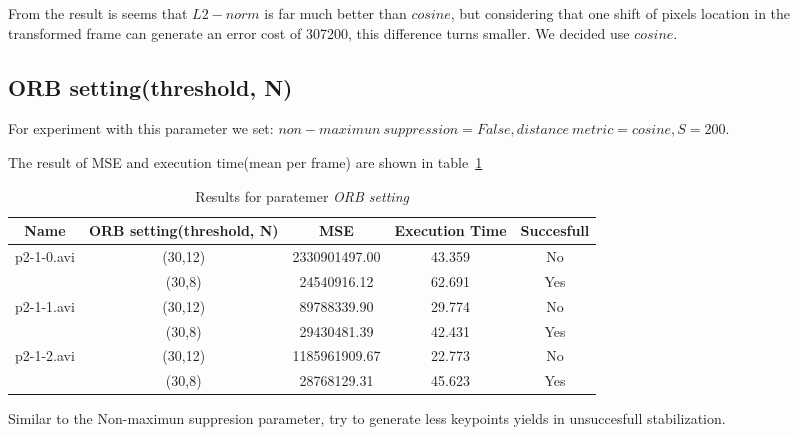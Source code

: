 From the result is seems that $L2-norm$ is far much better than $cosine$, but considering that one shift of pixels location in the transformed frame can generate an error cost of 307200, this difference turns smaller. We decided use $cosine$.

\subsection{ORB setting(threshold, N)}

For experiment with this parameter we set: $non-maximun~suppression=False, distance~metric=cosine, S = 200$.

The result of MSE and execution time(mean per frame) are shown in table~\ref{table:comparison-ORB}

\begin{table}[H]
\centering
\begin{tabular}{|c|c|c|c|c|}
\hline
\textbf{Name} & \textbf{ORB setting(threshold, N)} & \textbf{MSE} & \textbf{Execution Time} & \textbf{Succesfull} \\ \hline
\multirow{2}{*}{p2-1-0.avi} & (30,12) & 2330901497.00 & 43.359 & No \\ \cline{2-5} 
 & (30,8) & 24540916.12 & 62.691 & Yes \\ \hline
\multirow{2}{*}{p2-1-1.avi} & (30,12) & 89788339.90 & 29.774 & No \\ \cline{2-5} 
 & (30,8) & 29430481.39 & 42.431 & Yes \\ \hline
\multirow{2}{*}{p2-1-2.avi} & (30,12) & 1185961909.67 & 22.773 & No \\ \cline{2-5} 
 & (30,8) & 28768129.31 & 45.623 & Yes \\ \hline
\end{tabular}
\caption{Results for paratemer \textit{ORB setting}}
\label{table:comparison-ORB}
\end{table}

Similar to the Non-maximun suppresion parameter, try to generate less keypoints yields in unsuccesfull stabilization.

